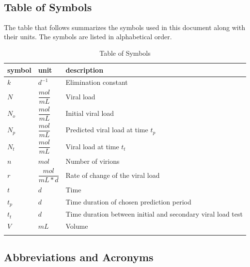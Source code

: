 \documentclass[12pt]{article}
\begin{document}
 
~\newpage
\subsection{Table of Symbols}

The table that follows summarizes the symbols used in this document along with
their units. The symbols are listed in alphabetical order.

\begin{table}[H]
\renewcommand{\arraystretch}{1.2}
\noindent \begin{longtable*}{l l p{12cm}} \toprule
\textbf{symbol} & \textbf{unit} & \textbf{description}\\
\midrule 
$k$ & $d^{-1}$ & Elimination constant
\\
$N$ & $\dfrac{mol}{mL}$ & Viral load
\\ 
$N_{o}$ & $\dfrac{mol}{mL}$  & Initial viral load
\\ 
$N_{p}$ & $\dfrac{mol}{mL}$  & Predicted viral load at time 
$t_{p}$
\\ 
$N_{t}$ & $\dfrac{mol}{mL}$  & Viral load at time $t_{t}$
\\ 
$n$ & $mol$ & Number of virions
\\ 
$r$ & $\dfrac{mol}{mL*d}$  & Rate of change of the viral 
load
\\
$t$ & $d$ & Time
\\

$t_{p}$ & $d$ & Time duration of chosen prediction 
period 
\\
$t_{t}$ & $d$ & Time duration between initial and  
secondary viral load test
\\
$V$ & $mL$ & Volume
\\
&\\
\bottomrule

\end{longtable*}
\caption{Table of Symbols}
\end{table}

\newpage

\subsection{Abbreviations and Acronyms}
\end{document}
